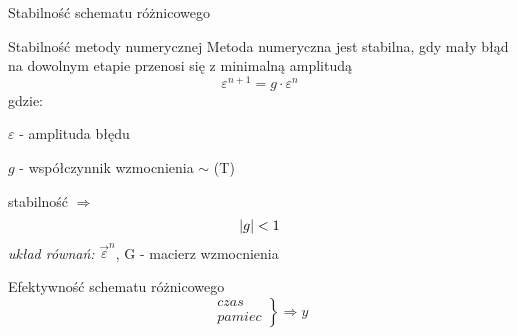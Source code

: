 \begin{frame}{Stabilność schematu różnicowego}
  \begin{block}{Stabilność metody numerycznej}
    Metoda numeryczna jest stabilna, gdy mały błąd na dowolnym etapie przenosi się z minimalną amplitudą
    $$\varepsilon^{n+1} = g \cdot \varepsilon^{n}$$
    gdzie: \par
    \quad $\varepsilon$ - amplituda błędu \par
    \quad $g$ - współczynnik wzmocnienia $\sim$ (T)
  \end{block}
  stabilność $\Rightarrow $ \[\abs{g} < 1\]
  \textit{układ równań:} $\vec{\varepsilon}^{n}$, G  - macierz wzmocnienia
\end{frame}
\begin{frame}{Efektywność schematu różnicowego}
$$\begin{array}{ll}
czas \\
pamiec
\end{array} \left.\right\} \Rightarrow y$$
\end{frame}
